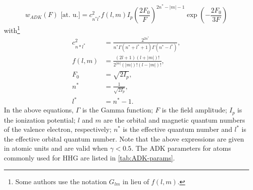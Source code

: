 \begin{equation}
w_{ADK}(F) \textrm{ [at. u.]} = c^2_{n^*l^*} f(l,m) I_p \left( \frac{2F_0}{F} \right)^{2n^*-|m|-1} \exp \left( - \frac{2 F_0}{3F} \right)
\label{eqn:ADK-rate}
\end{equation}
with\footnote{Some authors use the notation $G_{lm}$ in lieu of $f(l,m)$.}
\begin{align}
c_{n*l^*}^2 &= \frac{2^{2n^*}}{n^* \Gamma(n^* + l^* + 1) \Gamma(n^* - l^*)},  \\
f(l,m) &= \frac{(2l+1)(l+|m|)!}{2^{|m|} (|m|)! (l-|m|)!}, \\
F_0 &= \sqrt{2 I_p}, \\
n^* &= \frac{1}{\sqrt{2I_p}}, \\
l^* &= n^* - 1.
\end{align}
In the above equations, $\Gamma$ is the Gamma function; $F$ is the field amplitude; $I_p$ is the ionization potential; $l$ and $m$ are the orbital and magnetic quantum numbers of the valence electron, respectively; $n^*$ is the effective quantum number and $l^*$ is the effective orbital quantum number. Note that the above expressions are given in atomic units and are valid when $\gamma < 0.5$. The ADK parameters for atoms commonly used for HHG are listed in \cref{tab:ADK-params}.

